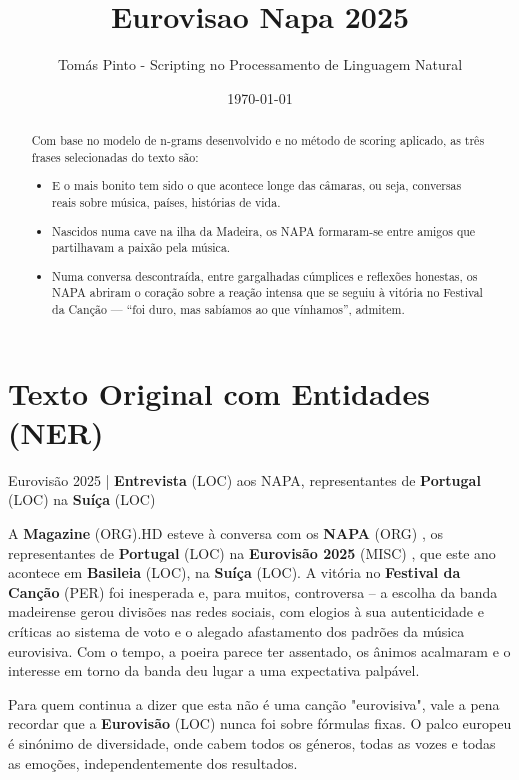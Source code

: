 \documentclass[12pt,a4paper]{article}
\title{Eurovisao Napa 2025}
\author{Tomás Pinto - Scripting no Processamento de Linguagem Natural}
\date{\today}
\begin{document}
\maketitle

\begin{abstract}
Com base no modelo de n-grams desenvolvido e no método de scoring aplicado, as três frases selecionadas do texto são:
\begin{itemize}
    \item E o mais bonito tem sido o que acontece longe das câmaras, ou seja, conversas reais sobre música, países, histórias de vida.
    \item Nascidos numa cave na ilha da Madeira, os NAPA formaram-se entre amigos que partilhavam a paixão pela música.
    \item Numa conversa descontraída, entre gargalhadas cúmplices e reflexões honestas, os NAPA abriram o coração sobre a reação intensa que se seguiu à vitória no Festival da Canção — “foi duro, mas sabíamos ao que vínhamos”, admitem.
\end{itemize}
\end{abstract}

\section{Texto Original com Entidades (NER)}
Eurovisão 2025 | \textbf{Entrevista} (LOC) aos NAPA, representantes de \textbf{Portugal} (LOC) na \textbf{Suíça} (LOC)



A \textbf{Magazine} (ORG).HD esteve à conversa com os \textbf{NAPA} (ORG) , os representantes de \textbf{Portugal} (LOC) na \textbf{Eurovisão 2025} (MISC) , que este ano acontece em \textbf{Basileia} (LOC), na \textbf{Suíça} (LOC). A vitória no \textbf{Festival da Canção} (PER) foi inesperada e, para muitos, controversa -- a escolha da banda madeirense gerou divisões nas redes sociais, com elogios à sua autenticidade e críticas ao sistema de voto e o alegado afastamento dos padrões da música eurovisiva. Com o tempo, a poeira parece ter assentado, os ânimos acalmaram e o interesse em torno da banda deu lugar a uma expectativa palpável.



Para quem continua a dizer que esta não é uma canção "eurovisiva", vale a pena recordar que a \textbf{Eurovisão} (LOC) nunca foi sobre fórmulas fixas. O palco europeu é sinónimo de diversidade, onde cabem todos os géneros, todas as vozes e todas as emoções, independentemente dos resultados.
\end{document}
